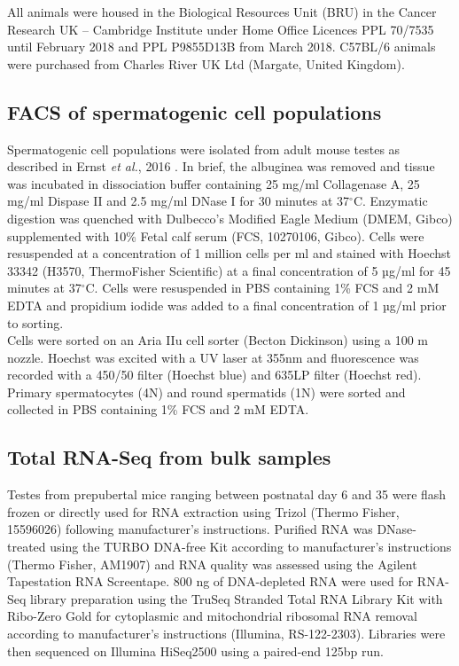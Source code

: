 All animals were housed in the Biological Resources Unit (BRU) in the Cancer Research UK – Cambridge Institute under Home Office Licences PPL 70/7535 until February 2018 and PPL P9855D13B from March 2018. C57BL/6 animals were purchased from Charles River UK Ltd (Margate, United Kingdom).
 
\subsection{FACS of spermatogenic cell populations}
\label{appA.2.sorting}

Spermatogenic cell populations were isolated from adult mouse testes as described in Ernst \emph{et al.}, 2016 \citep{Ernst2016}. In brief, the albuginea was removed and tissue was incubated in dissociation buffer containing 25 mg/ml Collagenase A, 25 mg/ml Dispase II and 2.5 mg/ml DNase I for 30 minutes at 37$^\circ$C. Enzymatic digestion was quenched with Dulbecco’s Modified Eagle Medium (DMEM, Gibco) supplemented with 10\% Fetal calf serum (FCS, 10270106, Gibco). Cells were resuspended at a concentration of 1 million cells per ml and stained with Hoechst 33342 (H3570, ThermoFisher Scientific) at a final concentration of 5 µg/ml for 45 minutes at 37$^\circ$C. Cells were resuspended in PBS containing 1\% FCS and 2 mM EDTA and propidium iodide was added to a final concentration of 1 µg/ml prior to sorting. \\
Cells were sorted on an Aria IIu cell sorter (Becton Dickinson) using a 100 \textmu{}m nozzle. Hoechst was excited with a UV laser at 355nm and fluorescence was recorded with a 450/50 filter (Hoechst blue) and 635LP filter (Hoechst red). Primary spermatocytes (4N) and round spermatids (1N) were sorted and collected in PBS containing 1\% FCS and 2 mM EDTA. 

\subsection{Total RNA-Seq from bulk samples}
\label{appA.2.bulk}

Testes from prepubertal mice ranging between postnatal day 6 and 35 were flash frozen or directly used for RNA extraction using Trizol (Thermo Fisher, 15596026) following manufacturer’s instructions. Purified RNA was DNase-treated using the TURBO DNA-free Kit according to manufacturer’s instructions (Thermo Fisher, AM1907) and RNA quality was assessed using the Agilent Tapestation RNA Screentape. 800 ng of DNA-depleted RNA were used for RNA-Seq library preparation using the TruSeq Stranded Total RNA Library Kit with Ribo-Zero Gold for cytoplasmic and mitochondrial ribosomal RNA removal according to manufacturer’s instructions (Illumina, RS-122-2303). Libraries were then sequenced on Illumina HiSeq2500 using a paired-end 125bp run. 

